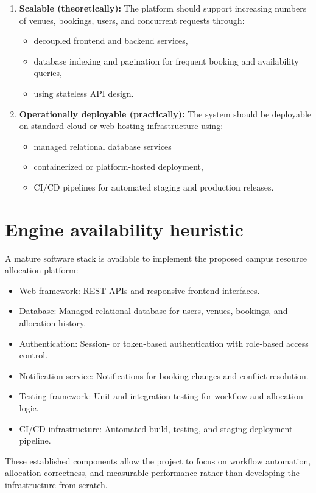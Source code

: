 \documentclass[11pt,a4paper]{article}
\begin{document}
\begin{enumerate}[leftmargin=0.7cm]
    \item \textbf{Scalable (theoretically):} The platform should support increasing numbers of venues, bookings, users, and concurrent requests through:
    \begin{itemize}[leftmargin=0.7cm]
        \item decoupled frontend and backend services,
        \item database indexing and pagination for frequent booking and availability queries,
        \item using stateless API design.
    \end{itemize}
    
    \item \textbf{Operationally deployable (practically):} The system should be deployable on standard cloud or web-hosting infrastructure using:
    \begin{itemize}[leftmargin=0.7cm]
        \item managed relational database services
        \item containerized or platform-hosted deployment,
        \item CI/CD pipelines for automated staging and production releases.
    \end{itemize}
\end{enumerate}

\section{Engine availability heuristic}
A mature software stack is available to implement the proposed campus resource allocation platform:
\begin{itemize}[leftmargin=0.7cm]
    \item Web framework: REST APIs and responsive frontend interfaces.
    \item Database: Managed relational database for users, venues, bookings, and allocation history.
    \item Authentication: Session- or token-based authentication with role-based access control.
    \item Notification service: Notifications for booking changes and conflict resolution.
    \item Testing framework: Unit and integration testing for workflow and allocation logic.
    \item CI/CD infrastructure: Automated build, testing, and staging deployment pipeline.
\end{itemize}
These established components allow the project to focus on workflow automation, allocation correctness, and measurable performance rather than developing the infrastructure from scratch.
\end{document}
